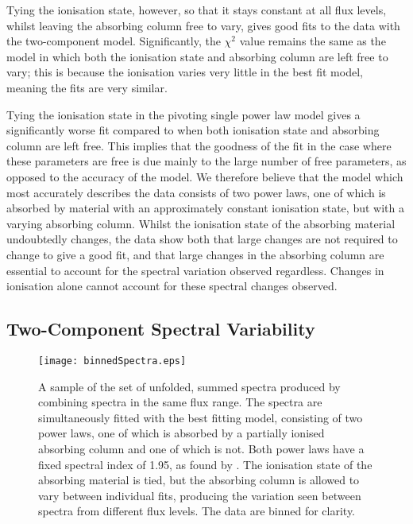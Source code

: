 \documentclass[useAMS,usenatbib]{sam}
\begin{document}
Tying the ionisation state, however, so that it stays constant at all flux levels, whilst leaving the absorbing column free to vary, gives good fits to the data with the
two-component model. Significantly, the $\chi^2$ value remains the same as the model in which both the ionisation state and absorbing column are left free to vary; this
is because the ionisation varies very little in the best fit model, meaning the fits are very similar. 

Tying the ionisation state in the pivoting single power law model gives a significantly worse fit compared to when both ionisation state and absorbing column are left
free. This implies that the goodness of the fit in the case where these parameters are free is due mainly to the large number of free parameters, as opposed to the
accuracy of the model. We therefore believe that the model which most accurately describes the data consists of two power laws, one of which is absorbed by material with
an approximately constant ionisation state, but with a varying absorbing column. Whilst the ionisation state of the absorbing material undoubtedly changes, the data show
both that large changes are not required to change to give a good fit, and that large changes in the absorbing column are essential to account for the spectral variation
observed regardless. Changes in ionisation alone cannot account for these spectral changes observed.


\subsection{Two-Component Spectral Variability}

\begin{figure}
	\texttt{[image: binnedSpectra.eps]}
	\caption{A sample of the set of unfolded, summed spectra produced by combining spectra in the same flux range. The spectra are simultaneously fitted with the best
fitting model,	consisting of two power laws, one of which is absorbed by a partially ionised absorbing column and one of which is not. Both power laws have a fixed
spectral index of 1.95, as found by \citet{risaliti13}. The ionisation state of the absorbing material is tied, but the absorbing column is allowed to vary between
individual fits, producing the variation seen between spectra from different flux levels. The data are binned for clarity.}
	\label{spectra}
\end{figure} 
\end{document}
